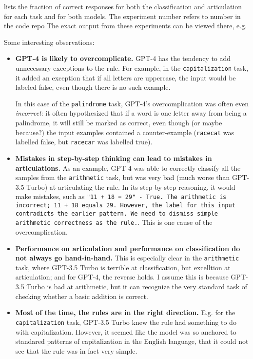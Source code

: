 \documentclass{article}
\newcommand{\gptf}{GPT-4}
\newcommand{\gptt}{GPT-3.5 Turbo}
\begin{document}
 lists the fraction of correct responses
for both the classification and articulation for each task and for both models.
The experiment number refers to number in the code repo %
The exact output from these experiments can be viewed there,
e.g. %

Some interesting observations:

\begin{itemize}
  \item \textbf{\gptf{} is likely to overcomplicate.}
    \gptf{} has the tendency to add unnecessary exceptions to the rule.
    For example, in the \texttt{capitalization} task, it
    added an exception that if all letters are uppercase, the input would be labeled false,
    even though there is no such example.

    In this case of the \texttt{palindrome} task, \gptf{}'s overcomplication
    was often even \emph{incorrect}:
    it often hypothesized that if a word is one letter away from being a palindrome,
    it will still be marked as correct,
    even though (or maybe because?) the input examples contained a counter-example
    (\texttt{racecat} was labelled false, but \texttt{racecar} was labelled true).

  \item \textbf{Mistakes in step-by-step thinking can lead to mistakes in articulations.}
    As an example, \gptf{} was able to correctly classify all the samples
    from the \texttt{arithmetic} task, but was very bad (much worse than \gptt{})
    at articulating the rule.
    In its step-by-step reasoning, 
    it would make mistakes, such as
    \lstinline|"11 + 18 = 29" - True. The arithmetic is incorrect; 11 + 18 equals 29. However, the label for this input contradicts the earlier pattern. We need to dismiss simple arithmetic correctness as the rule.|.
    This is one cause of the overcomplication.

  \item \textbf{Performance on articulation and performance on classification do not always go hand-in-hand.}
    This is especially clear in the \texttt{arithmetic} task,
    where \gptt{} is terrible at classification, but excelltion at articulation;
    and for \gptf{}, the reverse holds.
    I assume this is because \gptt{} is bad at arithmetic,
    but it can recognize the very standard task of checking whether a basic addition is correct.

  \item \textbf{Most of the time, the rules are in the right direction.}
    E.g. for the \texttt{capitalization} task,
    \gptt{} knew the rule had something to do with capitalization.
    However, it seemed like the model was so anchored to standared patterns
    of capitalization in the English language, that it could not see
    that the rule was in fact very simple.
\end{itemize}
\end{document}
